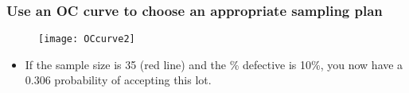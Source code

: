 \documentclass{beamer}
\begin{document}
\begin{frame}
	
	
	\frametitle{Use an OC curve to choose an appropriate sampling plan}

\begin{figure}
\centering
\texttt{[image: OCcurve2]}
\end{figure}

		\begin{itemize}
		\item If the sample size is 35 (red line) and the \% defective is 10\%, you now have a 0.306 probability of accepting this lot.
	\end{itemize}
\end{frame}
\end{document}
